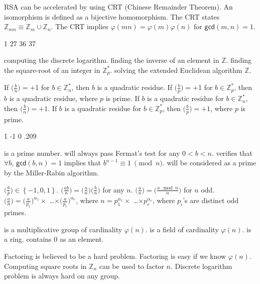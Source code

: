  {RSA can be accelerated by using CRT (Chinese Remainder Theorem).}
{An isomorphism is defined as a bijective homomorphism.}
 {The CRT states $\mathbb{Z}_{mn} \equiv \mathbb{Z}_{m} \cup \mathbb{Z}_{n}$.}
  {The CRT implies $\varphi(mn)=\varphi(m)\varphi(n)$ for  $\mathsf{gcd}(m,n)=1$.}
  
 {1}
 {27}
 {36}
 {37}
 

 {computing the discrete logarithm.}
 {finding  the inverse of an element in $\mathbb{Z}$.}
 {finding the square-root of an integer in $\mathbb{Z}_p^*$. }
 {solving the extended Euclidean algorithm  $\mathbb{Z}$.}
 
 {If $\Big(\frac{b}{n}\Big)=+$1 for $b \in \mathbb{Z}_n^* $, then $b$ is a quadratic residue.}
  {If $\Big(\frac{b}{p}\Big)=+$1 for $b \in \mathbb{Z}_p^* $, then $b$ is a quadratic residue, where $p$ is prime.}
 {If $b$ is a quadratic residue for $b \in \mathbb{Z}_n^* $, then $\Big(\frac{b}{n}\Big)=+1$.}
 {If $b$ is a quadratic residue for $b \in \mathbb{Z}_p^* $, then $\Big(\frac{b}{p}\Big)=+1$, where $p$ is prime.}
 
 {1}
 {-1}
 {0}
 {.209}
 
 {is a prime number.}
 {will always pass Fermat's test for any $0 < b < n$.}
 {verifies  that  $\forall b$, $\mathsf{gcd}(b,n)=1$ implies that $b^{n-1} \equiv 1 \ \pmod n $.}
 {will be considered as a prime by the Miller-Rabin algorithm.}
 
 {$\Big(\frac{b}{p}\Big) \in \left\{ -1,0,1\right\}$.}
 {$\Big(\frac{ab}{n}\Big) = \Big(\frac{a}{n}\Big)\Big(\frac{b}{n}\Big)$ for any $n$.}
 {$\Big(\frac{a}{n}\Big)= \Big(\frac{a \mod n}{n}\Big)$ for $n$ odd.}
 {$\Big(\frac{a}{n}\Big)={\Big(\frac{a}{p_1}\Big)}^{\alpha_1} \times $ \dots $ \times {\Big(\frac{a}{p_r}\Big)}^{\alpha_r}$, where $n=p_1^{\alpha_1}  \times $ \dots $ \times p_r^{\alpha_r}$, where $p_i$'s are distinct odd primes.}
 
 {is a multiplicative group of cardinality $\varphi{(n)}$.}
 {is a field of cardinality $\varphi{(n)}$.}
 {is a ring.}
 {contains 0 as an element.}
 
 {Factoring is believed to be a hard problem.}
 {Factoring is easy if we know $\varphi{(n)}$.}
 {Computing square roots in $\mathbb{Z}_n$ can be used to factor $n$.}
  {Discrete logarithm problem is always hard on any group.}
  
